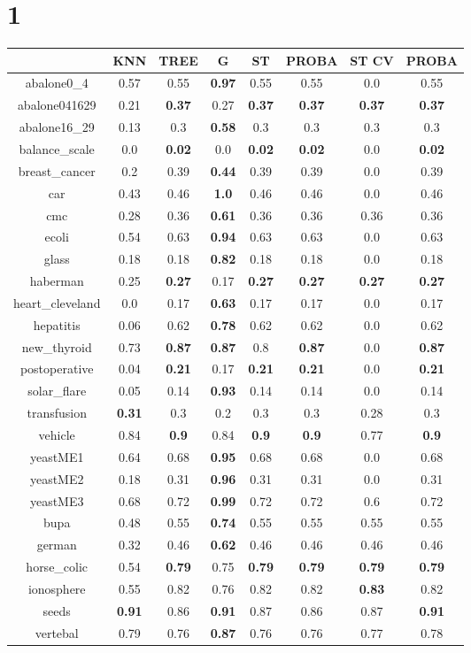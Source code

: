\documentclass{article}%
\begin{document}
%
\section*{1}%
\begin{tabular}{c|ccccccc}%
\hline%
&KNN&TREE&G&ST&PROBA&ST CV&PROBA\\%
\hline%
abalone0\_4&0.57&0.55&\textbf{0.97}&0.55&0.55&0.0&0.55\\%
\hline%
abalone041629&0.21&\textbf{0.37}&0.27&\textbf{0.37}&\textbf{0.37}&\textbf{0.37}&\textbf{0.37}\\%
\hline%
abalone16\_29&0.13&0.3&\textbf{0.58}&0.3&0.3&0.3&0.3\\%
\hline%
balance\_scale&0.0&\textbf{0.02}&0.0&\textbf{0.02}&\textbf{0.02}&0.0&\textbf{0.02}\\%
\hline%
breast\_cancer&0.2&0.39&\textbf{0.44}&0.39&0.39&0.0&0.39\\%
\hline%
car&0.43&0.46&\textbf{1.0}&0.46&0.46&0.0&0.46\\%
\hline%
cmc&0.28&0.36&\textbf{0.61}&0.36&0.36&0.36&0.36\\%
\hline%
ecoli&0.54&0.63&\textbf{0.94}&0.63&0.63&0.0&0.63\\%
\hline%
glass&0.18&0.18&\textbf{0.82}&0.18&0.18&0.0&0.18\\%
\hline%
haberman&0.25&\textbf{0.27}&0.17&\textbf{0.27}&\textbf{0.27}&\textbf{0.27}&\textbf{0.27}\\%
\hline%
heart\_cleveland&0.0&0.17&\textbf{0.63}&0.17&0.17&0.0&0.17\\%
\hline%
hepatitis&0.06&0.62&\textbf{0.78}&0.62&0.62&0.0&0.62\\%
\hline%
new\_thyroid&0.73&\textbf{0.87}&\textbf{0.87}&0.8&\textbf{0.87}&0.0&\textbf{0.87}\\%
\hline%
postoperative&0.04&\textbf{0.21}&0.17&\textbf{0.21}&\textbf{0.21}&0.0&\textbf{0.21}\\%
\hline%
solar\_flare&0.05&0.14&\textbf{0.93}&0.14&0.14&0.0&0.14\\%
\hline%
transfusion&\textbf{0.31}&0.3&0.2&0.3&0.3&0.28&0.3\\%
\hline%
vehicle&0.84&\textbf{0.9}&0.84&\textbf{0.9}&\textbf{0.9}&0.77&\textbf{0.9}\\%
\hline%
yeastME1&0.64&0.68&\textbf{0.95}&0.68&0.68&0.0&0.68\\%
\hline%
yeastME2&0.18&0.31&\textbf{0.96}&0.31&0.31&0.0&0.31\\%
\hline%
yeastME3&0.68&0.72&\textbf{0.99}&0.72&0.72&0.6&0.72\\%
\hline%
bupa&0.48&0.55&\textbf{0.74}&0.55&0.55&0.55&0.55\\%
\hline%
german&0.32&0.46&\textbf{0.62}&0.46&0.46&0.46&0.46\\%
\hline%
horse\_colic&0.54&\textbf{0.79}&0.75&\textbf{0.79}&\textbf{0.79}&\textbf{0.79}&\textbf{0.79}\\%
\hline%
ionosphere&0.55&0.82&0.76&0.82&0.82&\textbf{0.83}&0.82\\%
\hline%
seeds&\textbf{0.91}&0.86&\textbf{0.91}&0.87&0.86&0.87&\textbf{0.91}\\%
\hline%
vertebal&0.79&0.76&\textbf{0.87}&0.76&0.76&0.77&0.78\\%
\hline%
\end{tabular}
\end{document}
